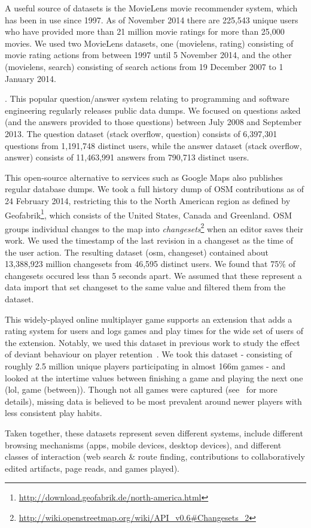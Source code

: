  A useful source of datasets is the MovieLens movie recommender system, which has been in use since 1997. As of November 2014 there are 225,543 unique users who have provided more than 21 million movie ratings for more than 25,000 movies. We used two MovieLens datasets, one (movielens, rating) consisting of movie rating actions from between 1997 until 5 November 2014, and the other (movielens, search) consisting of search actions from 19 December 2007 to 1 January 2014.

. This popular question/answer system relating to programming and software engineering regularly releases public data dumps. We focused on questions asked (and the answers provided to those questions) between July 2008 and September 2013. The question dataset (stack overflow, question) consists of 6,397,301 questions from 1,191,748 distinct users, while the answer dataset (stack overflow, answer) consists of 11,463,991 answers from 790,713 distinct users.

 This open-source alternative to services such as Google Maps also publishes regular database dumps. We took a full history dump of OSM contributions as of 24 February 2014, restricting this to the North American region as defined by Geofabrik\footnote{\url{http://download.geofabrik.de/north-america.html}}, which consists of the United States, Canada and Greenland. OSM groups individual changes to the map into \textit{changesets}\footnote{\url{http://wiki.openstreetmap.org/wiki/API_v0.6#Changesets_2}} when an editor saves their work. We used the timestamp of the last revision in a changeset as the time of the user action. The resulting dataset (osm, changeset) contained about 13,388,923 million changesets from 46,595 distinct users.  We found that 75\% of changesets occured less than 5 seconds apart.  We assumed that these represent a data import that set changeset to the same value and filtered them from the dataset.

 This widely-played online multiplayer game supports an extension that adds a rating system for users and logs games and play times for the wide set of users of the extension.  Notably, we used this dataset in previous work to study the effect of deviant behaviour on player retention~\cite{shores2014identification}. We took this dataset - consisting of roughly 2.5 million unique players participating in almost 166m games - and looked at the intertime values between finishing a game and playing the next one (lol, game (between)). Though not all games were captured (see~\cite{shores2014identification} for more details), missing data is believed to be most prevalent around newer players with less consistent play habits.

Taken together, these datasets represent seven different systems, include different browsing mechanisms (apps, mobile devices, desktop devices), and different classes of interaction (web search \& route finding, contributions to collaboratively edited artifacts, page reads, and games played).
